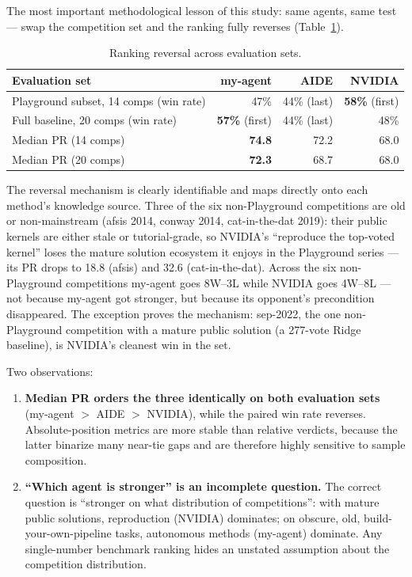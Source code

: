 \documentclass[11pt,a4paper]{article}
\begin{document}
The most important methodological lesson of this study: same agents, same test --- swap the competition set and the ranking fully reverses (Table~\ref{tab:reversal}).

\begin{table}[htbp]
\centering\small
\caption{Ranking reversal across evaluation sets.}
\label{tab:reversal}
\begin{tabular}{@{}lrrr@{}}
\toprule
\textbf{Evaluation set} & \textbf{my-agent} & \textbf{AIDE} & \textbf{NVIDIA} \\
\midrule
Playground subset, 14 comps (win rate) & 47\% & 44\% (last) & \textbf{58\%} (first) \\
Full baseline, 20 comps (win rate) & \textbf{57\%} (first) & 44\% (last) & 48\% \\
Median PR (14 comps) & \textbf{74.8} & 72.2 & 68.0 \\
Median PR (20 comps) & \textbf{72.3} & 68.7 & 68.0 \\
\bottomrule
\end{tabular}
\end{table}

The reversal mechanism is clearly identifiable and maps directly onto each method's knowledge source. Three of the six non-Playground competitions are old or non-mainstream (afsis 2014, conway 2014, cat-in-the-dat 2019): their public kernels are either stale or tutorial-grade, so NVIDIA's ``reproduce the top-voted kernel'' loses the mature solution ecosystem it enjoys in the Playground series --- its PR drops to 18.8 (afsis) and 32.6 (cat-in-the-dat). Across the six non-Playground competitions my-agent goes 8W--3L while NVIDIA goes 4W--8L --- not because my-agent got stronger, but because its opponent's precondition disappeared. The exception proves the mechanism: sep-2022, the one non-Playground competition with a mature public solution (a 277-vote Ridge baseline), is NVIDIA's cleanest win in the set.

Two observations:

\begin{enumerate}[leftmargin=*]
  \item \textbf{Median PR orders the three identically on both evaluation sets} (my-agent $>$ AIDE $>$ NVIDIA), while the paired win rate reverses. Absolute-position metrics are more stable than relative verdicts, because the latter binarize many near-tie gaps and are therefore highly sensitive to sample composition.
  \item \textbf{``Which agent is stronger'' is an incomplete question.} The correct question is ``stronger on what distribution of competitions'': with mature public solutions, reproduction (NVIDIA) dominates; on obscure, old, build-your-own-pipeline tasks, autonomous methods (my-agent) dominate. Any single-number benchmark ranking hides an unstated assumption about the competition distribution.
\end{enumerate}
\end{document}
